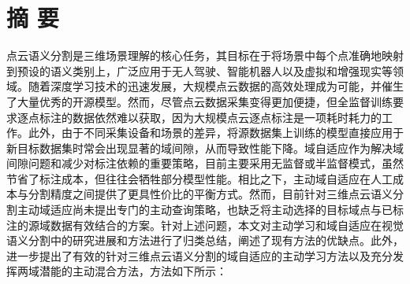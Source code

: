 
\chapter{摘 \quad 要}
\xiaosi
点云语义分割是三维场景理解的核心任务，其目标在于将场景中每个点准确地映射到预设的语义类别上，广泛应用于无人驾驶、智能机器人以及虚拟和增强现实等领域。随着深度学习技术的迅速发展，大规模点云数据的高效处理成为可能，并催生了大量优秀的开源模型。然而，尽管点云数据采集变得更加便捷，但全监督训练要求逐点标注的数据依然难以获取，因为大规模点云逐点标注是一项耗时耗力的工作。此外，由于不同采集设备和场景的差异，将源数据集上训练的模型直接应用于新目标数据集时常会出现显著的域间隙，从而导致性能下降。域自适应作为解决域间隙问题和减少对标注依赖的重要策略，目前主要采用无监督或半监督模式，虽然节省了标注成本，但往往会牺牲部分模型性能。相比之下，主动域自适应在人工成本与分割精度之间提供了更具性价比的平衡方式。然而，目前针对三维点云语义分割主动域适应尚未提出专门的主动查询策略，也缺乏将主动选择的目标域点与已标注的源域数据有效结合的方案。针对上述问题，本文对主动学习和域自适应在视觉语义分割中的研究进展和方法进行了归类总结，阐述了现有方法的优缺点。此外，进一步提出了有效的针对三维点云语义分割的域自适应的主动学习方法以及充分发挥两域潜能的主动混合方法，方法如下所示：


